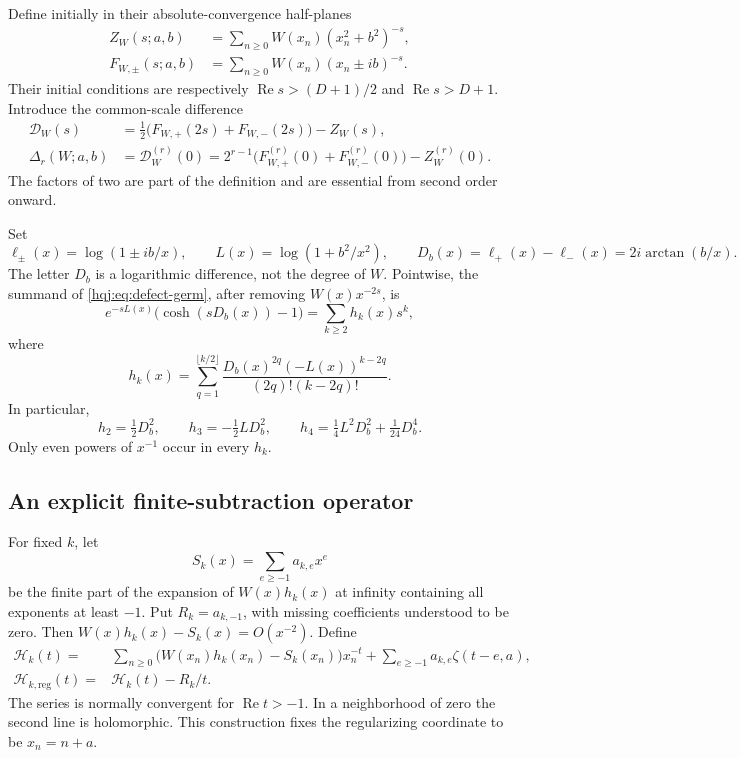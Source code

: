 \documentclass[11pt,letterpaper]{article}
\numberwithin{equation}{section}
\theoremstyle{definition}
\newcommand{\Rea}{\operatorname{Re}}
\begin{document}
Define initially in their absolute-convergence half-planes
\begin{align}
Z_W(s;a,b)&=\sum_{n\ge0}W(x_n)(x_n^2+b^2)^{-s},\label{hqj:eq:ZW}\\
F_{W,\pm}(s;a,b)&=\sum_{n\ge0}W(x_n)(x_n\pm ib)^{-s}.
\end{align}
Their initial conditions are respectively $\Rea s>(D+1)/2$ and
$\Rea s>D+1$. Introduce the common-scale difference
\begin{align}
\mathcal D_W(s)&=\tfrac12\bigl(F_{W,+}(2s)+F_{W,-}(2s)\bigr)-Z_W(s),
\label{hqj:eq:defect-germ}\\
\Delta_r(W;a,b)&=\mathcal D_W^{(r)}(0)
=2^{r-1}\bigl(F_{W,+}^{(r)}(0)+F_{W,-}^{(r)}(0)\bigr)-Z_W^{(r)}(0).
\label{hqj:eq:defect}
\end{align}
The factors of two are part of the definition and are essential from
second order onward.

Set
\begin{equation}\label{hqj:eq:logs}
\ell_\pm(x)=\log(1\pm ib/x),\qquad
L(x)=\log(1+b^2/x^2),\qquad
D_b(x)=\ell_+(x)-\ell_-(x)=2i\arctan(b/x).
\end{equation}
The letter $D_b$ is a logarithmic difference, not the degree of $W$.
Pointwise, the summand of \eqref{hqj:eq:defect-germ}, after removing
$W(x)x^{-2s}$, is
\begin{equation}\label{hqj:eq:cosh}
e^{-sL(x)}\bigl(\cosh(sD_b(x))-1\bigr)
=\sum_{k\ge2}h_k(x)s^k,
\end{equation}
where
\begin{equation}\label{hqj:eq:hk}
h_k(x)=\sum_{q=1}^{\lfloor k/2\rfloor}
\frac{D_b(x)^{2q}(-L(x))^{k-2q}}{(2q)!(k-2q)!}.
\end{equation}
In particular,
\[
h_2=\tfrac12D_b^2,\qquad h_3=-\tfrac12LD_b^2,
\qquad h_4=\tfrac14L^2D_b^2+\tfrac1{24}D_b^4.
\]
Only even powers of $x^{-1}$ occur in every $h_k$.

\subsection{An explicit finite-subtraction operator}
For fixed $k$, let
\begin{equation}\label{hqj:eq:Sk}
S_k(x)=\sum_{e\ge-1}a_{k,e}x^e
\end{equation}
be the finite part of the expansion of $W(x)h_k(x)$ at infinity containing
all exponents at least $-1$. Put $R_k=a_{k,-1}$, with missing coefficients
understood to be zero. Then $W(x)h_k(x)-S_k(x)=O(x^{-2})$.
Define
\begin{align}
\mathcal H_k(t)={}&\sum_{n\ge0}\bigl(W(x_n)h_k(x_n)-S_k(x_n)\bigr)x_n^{-t}
+\sum_{e\ge-1}a_{k,e}\zeta(t-e,a),\label{hqj:eq:Hk}\\
\mathcal H_{k,\mathrm{reg}}(t)={}&\mathcal H_k(t)-R_k/t.
\end{align}
The series is normally convergent for $\Rea t>-1$. In a neighborhood of
zero the second line is holomorphic. This construction fixes the
regularizing coordinate to be $x_n=n+a$.
\end{document}

